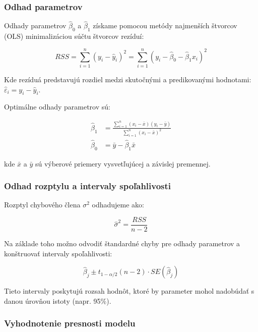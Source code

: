 \subsubsection{Odhad parametrov}

Odhady parametrov $\hat{\beta}_0$ a $\hat{\beta}_1$ získame pomocou metódy najmenších štvorcov (OLS) minimalizáciou súčtu štvorcov rezíduí:

\begin{equation}
RSS = \sum_{i=1}^{n} \left( y_i - \hat{y}_i \right)^2 = \sum_{i=1}^{n} \left( y_i - \hat{\beta}_0 - \hat{\beta}_1 x_i \right)^2
\end{equation}

Kde rezíduá predstavujú rozdiel medzi skutočnými a predikovanými hodnotami: $\hat{\varepsilon}_i = y_i - \hat{y}_i$.

Optimálne odhady parametrov sú:

\begin{align}
\hat{\beta}_1 &= \frac{\sum_{i=1}^{n}(x_i - \bar{x})(y_i - \bar{y})}{\sum_{i=1}^{n}(x_i - \bar{x})^2} \\
\hat{\beta}_0 &= \bar{y} - \hat{\beta}_1 \bar{x}
\end{align}

kde $\bar{x}$ a $\bar{y}$ sú výberové priemery vysvetľujúcej a závislej premennej.

\subsubsection{Odhad rozptylu a intervaly spoľahlivosti}

Rozptyl chybového člena $\sigma^2$ odhadujeme ako:

\begin{equation}
\hat{\sigma}^2 = \frac{RSS}{n - 2}
\end{equation}

Na základe toho možno odvodiť štandardné chyby pre odhady parametrov a konštruovať intervaly spoľahlivosti:

\begin{equation}
\hat{\beta}_j \pm t_{1 - \alpha/2}(n - 2) \cdot SE(\hat{\beta}_j)
\end{equation}

Tieto intervaly poskytujú rozsah hodnôt, ktoré by parameter mohol nadobúdať s danou úrovňou istoty (napr. 95\%).

\subsubsection{Vyhodnotenie presnosti modelu}

